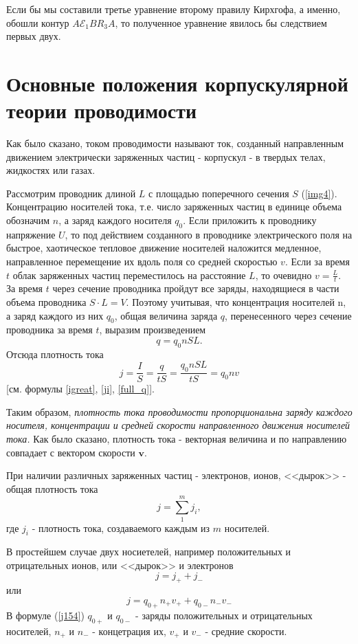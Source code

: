 \documentclass[a4paper,10pt]{book}
\begin{document}
Если бы мы составили третье уравнение  второму правилу Кирхгофа, а именно, обошли контур $A\mathcal{E}_1BR_3A$, то полученное уравнение явилось бы следствием первых двух.
\chapter{Основные положения корпускулярной теории проводимости}
Как было сказано, током проводимости называют ток, созданный направленным движением электрически заряженных частиц - корпускул - в твердых телах, жидкостях или газах.
 
Рассмотрим проводник длиной $L$ с площадью поперечного сечения $S$ (\ref{img4}). Концентрацию носителей тока, т.е. число заряженных частиц в единице объема обозначим $n$, а заряд каждого носителя $q_0$. Если приложить к проводнику напряжение $U$, то под действием созданного в проводнике электрического поля на быстрое, хаотическое тепловое движение носителей наложится медленное, направленное перемещение их вдоль поля со средней скоростью $v$. Если за время $t$ облак заряженных частиц переместилось на расстояние $L$, то очевидно $v = \frac{L}{t}$. За время $t$ через сечение проводника пройдут все заряды, находящиеся в части объема проводника $S\cdot L = V$. Поэтому учитывая, что концентрация
носителей n, а заряд каждого из них $q_0$, общая величина заряда $q$, перенесенного через сечение проводника за время $t$, выразим произведением
\begin{equation}\label{full_q}
 q = q_0nSL.
\end{equation}
Отсюда плотность тока
\begin{equation}\label{density}
 j = \frac{I}{S} = \frac{q}{tS} = \frac{q_0nSL}{tS} = q_0nv
\end{equation}
[см. формулы \ref{igreat}, \ref{ji}, \ref{full_q}].

Таким образом, \emph{плотность тока проводимости пропорциональна заряду каждого носителя, концентрации и средней скорости направленного движения носителей тока.} Как было сказано, плотность тока - векторная величина и по направлению совпадает с вектором скорости $\mathbf{v}$.

При наличии различных заряженных частиц - электронов, ионов, <<дырок>> - общая плотность тока
\begin{equation}\label{job}
 j = \sum_1^mj_i,
\end{equation}
где $j_i$ - плотность тока, создаваемого каждым из $m$ носителей.

В простейшем случае двух носиетелей, например положительных и отрицательных ионов, или <<дырок>> и электронов
\begin{equation*}
 j = j_+ + j_-
\end{equation*}
или
\begin{equation}\label{j154}
  j = q_{0+}n_+v_+ + q_{0-}n_-v_-
\end{equation}
В формуле (\ref{j154}) $q_{0+}$ и $q_{0-}$ - заряды положительных и отрицательных носителей, $n_+$ и $n_-$ - концетрация их, $v_+$ и $v_-$ 
- средние скорости.
\end{document}

